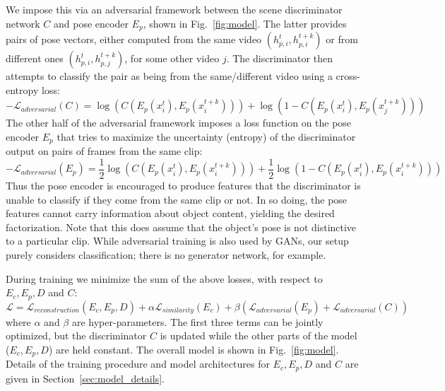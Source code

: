 \documentclass{article}
\newcommand{\fig}[1]{Fig.~\ref{fig:#1}}
\newcommand{\secc}[1]{Section~\ref{sec:#1}}
\begin{document}
We impose this via an adversarial framework between the scene discriminator network $C$ and pose encoder $E_p$, shown in \fig{model}. The latter provides pairs of pose vectors, either computed from the same video $(h_{p,i}^t, h_{p,i}^{t+k})$ or from different ones $(h_{p,i}^t, h_{p,j}^{t+k})$, for some other video $j$. The discriminator then attempts to classify the pair as being from the same/different video using a cross-entropy loss:
\begin{equation}
    - \mathcal{L}_{adversarial}(C) =  \log( C( E_p(x_i^t), E_p(x_i^{t+k})))  + \log( 1- C(E_p(x_i^t), E_p(x_j^{t+k})))
\end{equation}
The other half of the adversarial framework imposes a loss function on the pose encoder $E_p$ that tries to maximize the uncertainty (entropy) of the discriminator output on pairs of frames from the same clip:
\begin{equation}
    - \mathcal{L}_{adversarial}(E_p) = \frac{1}{2} \log( C( E_p(x_i^t), E_p(x_i^{t+k}))) + \frac{1}{2} \log( 1- C(E_p(x_i^t), E_p(x_i^{t+k})))
\end{equation}
Thus the pose encoder is encouraged to produce features that the discriminator is unable to classify if they come from the same clip or not. In so doing, the pose features cannot carry information about object content, yielding the desired factorization. Note that this does assume that the object's pose is not distinctive to a particular clip. While adversarial training is also used by GANs, our setup purely considers classification; there is no generator network, for example. 

During training we minimize the sum of the above losses, with respect to $E_c, E_p, D$ and $C$:
\begin{equation}
\mathcal{L}  =
\mathcal{L}_{reconstruction}(E_c,E_p,D) + \alpha \mathcal{L}_{similarity}(E_c) + \beta (\mathcal{L}_{adversarial}(E_p) + \mathcal{L}_{adversarial}(C))
\end{equation}
where $\alpha$ and $\beta$ are hyper-parameters. The first three terms can be jointly optimized, but the discriminator $C$ is updated while the other parts of the model ($E_c,E_p,D$) are held constant. The overall model is shown in \fig{model}. Details of the training procedure and model architectures for $E_c, E_p, D$ and $C$ are given in \secc{model_details}.
\end{document}
